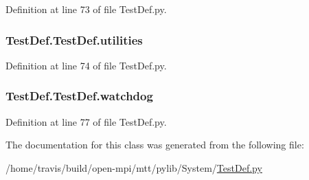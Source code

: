 Definition at line 73 of file Test\-Def.\-py.

\hypertarget{class_test_def_1_1_test_def_a0b9ea6f06c02401ad62e06c4cfd80bd2}{
\subsubsection[{utilities}]{\setlength{\rightskip}{0pt plus 5cm}Test\-Def.\-Test\-Def.\-utilities}}\label{class_test_def_1_1_test_def_a0b9ea6f06c02401ad62e06c4cfd80bd2}


Definition at line 74 of file Test\-Def.\-py.

\hypertarget{class_test_def_1_1_test_def_a40da46aa95507cffa798cb152fa69e27}{
\subsubsection[{watchdog}]{\setlength{\rightskip}{0pt plus 5cm}Test\-Def.\-Test\-Def.\-watchdog}}\label{class_test_def_1_1_test_def_a40da46aa95507cffa798cb152fa69e27}


Definition at line 77 of file Test\-Def.\-py.



The documentation for this class was generated from the following file\-:\begin{DoxyCompactItemize}
\item 
/home/travis/build/open-\/mpi/mtt/pylib/\-System/\hyperlink{_test_def_8py}{Test\-Def.\-py}\end{DoxyCompactItemize}
